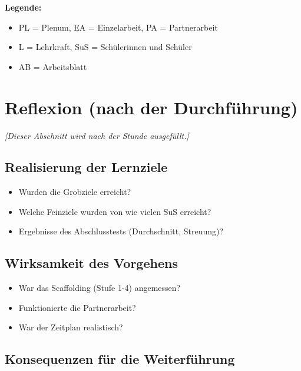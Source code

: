 \documentclass[11pt, a4paper]{article}
\begin{document}
\textbf{Legende:}
\begin{itemize}[nosep, leftmargin=2em]
    \item PL = Plenum, EA = Einzelarbeit, PA = Partnerarbeit
    \item L = Lehrkraft, SuS = Schülerinnen und Schüler
    \item AB = Arbeitsblatt
\end{itemize}


\section{Reflexion (nach der Durchführung)}

\textit{[Dieser Abschnitt wird nach der Stunde ausgefüllt.]}

\subsection{Realisierung der Lernziele}

\begin{itemize}[leftmargin=2em]
    \item Wurden die Grobziele erreicht?
    \item Welche Feinziele wurden von wie vielen SuS erreicht?
    \item Ergebnisse des Abschlusstests (Durchschnitt, Streuung)?
\end{itemize}

\subsection{Wirksamkeit des Vorgehens}

\begin{itemize}[leftmargin=2em]
    \item War das Scaffolding (Stufe 1-4) angemessen?
    \item Funktionierte die Partnerarbeit?
    \item War der Zeitplan realistisch?
\end{itemize}

\subsection{Konsequenzen für die Weiterführung}
\end{document}
